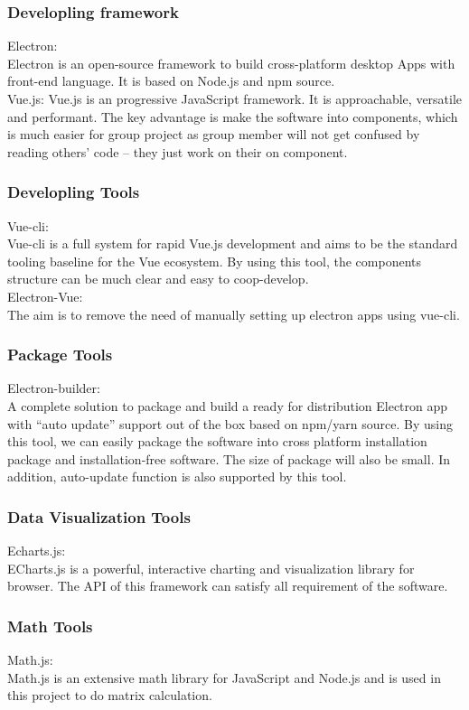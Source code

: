 \documentclass[11pt,oneside,a4paper]{article}
\begin{document}
\subsubsection{Developling framework}
Electron: \\
Electron is an open-source framework to build cross-platform desktop Apps with front-end language. It is based on Node.js and npm source.
\\
Vue.js:
Vue.js is an progressive JavaScript framework. It is approachable, versatile and performant.
The key advantage is make the software into components, which is much easier for group project as group member will not get confused by reading others’ code – they just work on their on component.

\subsubsection{Developling Tools}
Vue-cli:\\
Vue-cli is a full system for rapid Vue.js development and aims to be the standard tooling baseline for the Vue ecosystem.
By using this tool, the components structure can be much clear and easy to coop-develop.
\\
Electron-Vue:\\
The aim is to remove the need of manually setting up electron apps using vue-cli.

\subsubsection{Package Tools}
Electron-builder:\\
A complete solution to package and build a ready for distribution Electron app with “auto update” support out of the box based on npm/yarn source.
By using this tool, we can easily package the software into cross platform installation package and installation-free software. The size of package will also be small. In addition, auto-update function is also supported by this tool.

\subsubsection{Data Visualization Tools}
Echarts.js:\\
ECharts.js is a powerful, interactive charting and visualization library for browser.
The API of this framework can satisfy all requirement of the software.

\subsubsection{Math Tools}
Math.js:\\
Math.js is an extensive math library for JavaScript and Node.js and is used in this project to do matrix calculation.
\end{document}
